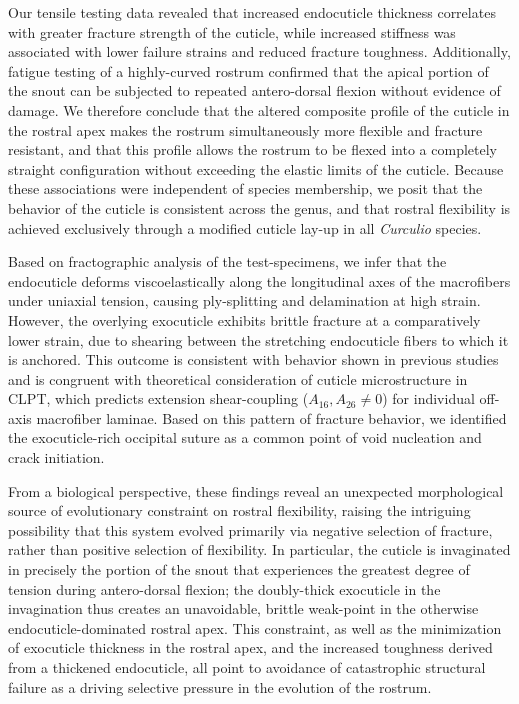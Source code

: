 \documentclass[twocolumn, linenumbers, superscriptaddress]{revtex4-1}
\begin{document}
		Our tensile testing data revealed that increased endocuticle thickness correlates with greater fracture strength of the cuticle, while increased stiffness was associated with lower failure strains and reduced fracture toughness.
		Additionally, fatigue testing of a highly-curved rostrum confirmed that the apical portion of the snout can be subjected to repeated antero-dorsal flexion without evidence of damage.
		We therefore conclude that the altered composite profile of the cuticle in the rostral apex makes the rostrum simultaneously more flexible and fracture resistant, and that this profile allows the rostrum to be flexed into a completely straight configuration without exceeding the elastic limits of the cuticle.
		Because these associations were independent of species membership, we posit that the behavior of the cuticle is consistent across the genus, and that rostral flexibility is achieved exclusively through a modified cuticle lay-up in all \textit{Curculio} species.
		
		Based on fractographic analysis of the test-specimens, we infer that the endocuticle deforms viscoelastically along the longitudinal axes of the macrofibers under uniaxial tension, causing ply-splitting and delamination at high strain.
		However, the overlying exocuticle exhibits brittle fracture at a comparatively lower strain, due to shearing between the stretching endocuticle fibers to which it is anchored.
		This outcome is consistent with behavior shown in previous studies and is congruent with theoretical consideration of cuticle microstructure in CLPT, which predicts extension shear-coupling ($A_{16}, A_{26}\neq{0}$) for individual off-axis macrofiber laminae.
		Based on this pattern of fracture behavior, we identified the exocuticle-rich occipital suture as a common point of void nucleation and crack initiation.
		
		From a biological perspective, these findings reveal an unexpected morphological source of evolutionary constraint on rostral flexibility, raising the intriguing possibility that this system evolved primarily via negative selection of fracture, rather than positive selection of flexibility.
		In particular, the cuticle is invaginated in precisely the portion of the snout that experiences the greatest degree of tension during antero-dorsal flexion; the doubly-thick exocuticle in the invagination thus creates an unavoidable, brittle weak-point in the otherwise endocuticle-dominated rostral apex.
		This constraint, as well as the minimization of exocuticle thickness in the rostral apex, and the increased toughness derived from a thickened endocuticle, all point to avoidance of catastrophic structural failure as a driving selective pressure in the evolution of the rostrum.
		 
\end{document}
